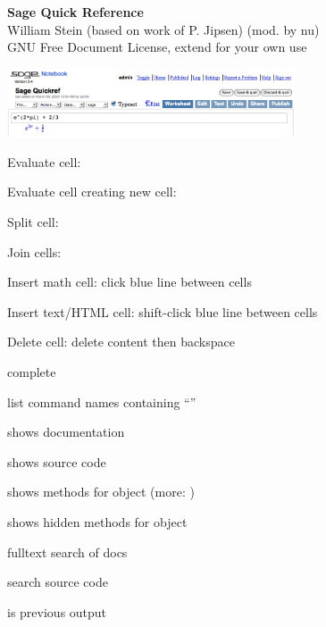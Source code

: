 \documentclass[a4paper]{article}
\begin{document}
\begin{multicols*}{3}
\begin{center}
\textbf{Sage Quick Reference}\\
William Stein (based on work of P. Jipsen) (mod. by nu)\\
GNU Free Document License, extend for your own use\\
\end{center}
\vspace{-2ex}


\includegraphics[width=23em]{nb2.png}

Evaluate cell: \shiftEnterkey{}

Evaluate cell creating new cell: \altEnterkey{}

Split cell: 

Join cells: \controlBackspacekey

Insert math cell: click blue line between cells

Insert text/HTML cell: shift-click blue line between cells

Delete cell: delete content then backspace


\tabkey{} complete 

\EX{*} list command names containing ``''

\tabkey{} shows documentation

\tabkey{} shows source code

\tabkey{} shows methods for object  \hfil
(more: )

\tabkey{} shows hidden methods for object  

  fulltext search of docs

  search source code

\EX{_} is previous output



\end{multicols*}
\end{document}
